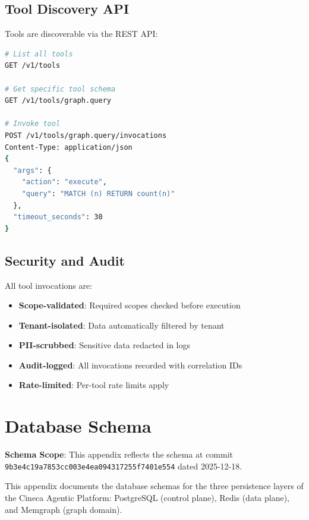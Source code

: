 \documentclass[a4paper,twoside]{sapthesis}
\begin{document}
\section{Tool Discovery API}
\label{app:tools:discovery}

Tools are discoverable via the REST API:

\begin{lstlisting}[language=bash]
# List all tools
GET /v1/tools

# Get specific tool schema
GET /v1/tools/graph.query

# Invoke tool
POST /v1/tools/graph.query/invocations
Content-Type: application/json
{
  "args": {
    "action": "execute",
    "query": "MATCH (n) RETURN count(n)"
  },
  "timeout_seconds": 30
}
\end{lstlisting}

\section{Security and Audit}
\label{app:tools:audit}

All tool invocations are:
\begin{itemize}
    \item \textbf{Scope-validated}: Required scopes checked before execution
    \item \textbf{Tenant-isolated}: Data automatically filtered by tenant
    \item \textbf{PII-scrubbed}: Sensitive data redacted in logs
    \item \textbf{Audit-logged}: All invocations recorded with correlation IDs
    \item \textbf{Rate-limited}: Per-tool rate limits apply
\end{itemize}


\chapter{Database Schema}
\label{app:database-schema}

\textbf{Schema Scope}: This appendix reflects the schema at commit \texttt{9b3e4c19a7853cc003e4ea094317255f7401e554} dated 2025-12-18.

This appendix documents the database schemas for the three persistence layers of the Cineca Agentic Platform: PostgreSQL (control plane), Redis (data plane), and Memgraph (graph domain).
\end{document}
